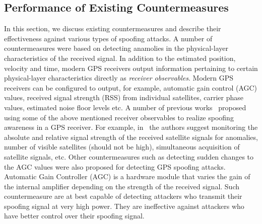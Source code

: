 \documentclass[letterpaper,twocolumn,10pt]{article}
\makeatletter
\newcommand{\etc}{etc.\@\xspace}
\makeatother
\begin{document}
\subsection{Performance of Existing Countermeasures}
\label{subsec:proposed_countermeasures}
In this section, we discuss existing countermeasures and describe their effectiveness against  various types of spoofing attacks. A number of countermeasures were based on detecting anamolies in the physical-layer characteristics of the received signal. In addition to the estimated position, velocity and time, modern GPS receivers output information pertaining to certain physical-layer characteristics directly as \emph{receiver observables}. Modern GPS receivers can be configured to output, for example, automatic gain control (AGC) values, received signal strength (RSS) from individual satellites, carrier phase values, estimated noise floor levels \etc A number of previous works~\cite{Akos2012,Bastide2001,Warner2003} proposed using some of the above mentioned receiver observables to realize spoofing awareness in a GPS receiver. For example, in~\cite{Warner2003} the authors suggest monitoring the absolute and relative signal strength of the received satellite signals for anomalies, number of visible satellites (should not be high), simultaneous acquisition of satellite signals, \etc Other countermeasures such as detecting sudden changes to the AGC values were also proposed for detecting GPS spoofing attacks. Automatic Gain Controller (AGC) is a hardware module that varies the gain of the internal amplifier depending on the strength of the received signal. Such countermeasure are at best capable of detecting attackers who transmit their spoofing signal at very high power. They are ineffective against attackers who have better control over their spoofing signal.
\end{document}
